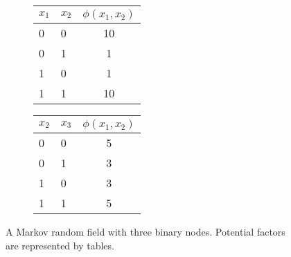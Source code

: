 \begin{figure}[!t]
  \begin{subfigure}{.3\textwidth}
  \end{subfigure}
  \begin{subfigure}{0.3\textwidth}
    \begin{tabular}{llc}
      \toprule
      $x_1$ & $x_2$ & $\phi(x_1, x_2)$ \\ %
      \midrule
      0  &  0  &  10 \\
      0  &  1  &  1 \\
      1  &  0  &  1 \\
      1  &  1  &  10\\
      \bottomrule
    \end{tabular}
  \end{subfigure}
  \begin{subfigure}{0.05\textwidth}
    \centering
  \end{subfigure}
  \begin{subfigure}{0.3\textwidth}
    \begin{tabular}{llc}
      \toprule
      $x_2$ & $x_3$ & $\phi(x_1, x_2)$ \\
      \midrule
      0  &  0  &  5 \\
      0  &  1  &  3 \\
      1  &  0  &  3 \\
      1  &  1  &  5 \\
      \bottomrule
    \end{tabular}
  \end{subfigure}
  \caption{A Markov random field with three binary nodes. Potential factors are represented by tables.}
  \label{chp2:fig:toy_mrf}
  \hspace{1cm}
\end{figure}

